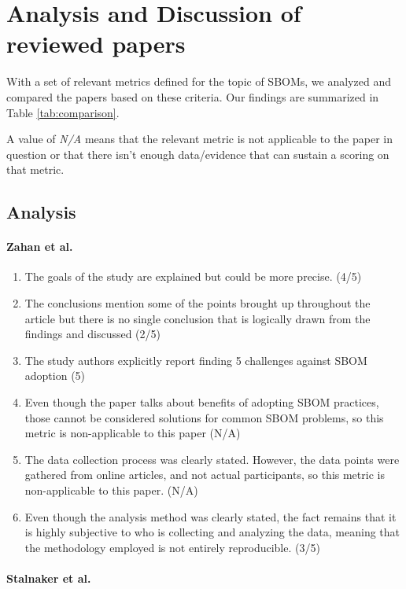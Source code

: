 \section{Analysis and Discussion of reviewed papers} \label{analysis-discussion}

With a set of relevant metrics defined for the topic of SBOMs, we analyzed and compared the papers based on these criteria. Our findings are summarized in Table \ref{tab:comparison}.

A value of \emph{N/A} means that the relevant metric is not applicable to the paper in question or that there isn't enough data/evidence that can sustain a scoring on that metric.

\subsection{Analysis} \label{analysis}

\paragraph{Zahan et al. \cite{article:sbom-required}}

\begin{enumerate}
    \item The goals of the study are explained but could be more precise. (4/5)
    \item The conclusions mention some of the points brought up throughout the article but there is no single conclusion that is logically drawn from the findings and discussed (2/5)
    \item The study authors explicitly report finding 5 challenges against SBOM adoption (5)
    \item Even though the paper talks about benefits of adopting SBOM practices, those cannot be considered solutions for common SBOM problems, so this metric is non-applicable to this paper (N/A)
    \item The data collection process was clearly stated. However, the data points were gathered from online articles, and not actual participants, so this metric is non-applicable to this paper. (N/A)
    \item Even though the analysis method was clearly stated, the fact remains that it is highly subjective to who is collecting and analyzing the data, meaning that the methodology employed is not entirely reproducible. (3/5)
\end{enumerate}

\paragraph{Stalnaker et al. \cite{article:software-bom}}

